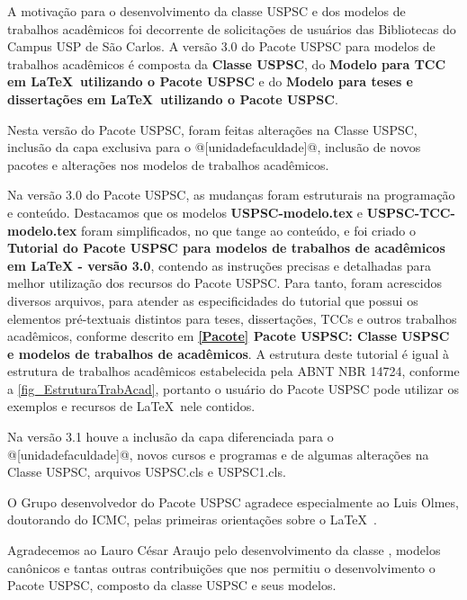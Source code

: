 \begin{agradecimentos}
	A motiva\c{c}\~ao para o desenvolvimento da classe USPSC e dos modelos de trabalhos acad\^emicos foi decorrente de solicita\c{c}\~oes de usu\'arios das Bibliotecas do Campus USP de S\~ao Carlos. A vers\~ao 3.0 do Pacote USPSC para modelos de trabalhos acad\^emicos \'e composta da \textbf{Classe USPSC}, do \textbf{Modelo para TCC em \LaTeX\ utilizando o Pacote USPSC} e do \textbf{Modelo para teses e disserta\c{c}\~oes em \LaTeX\ utilizando o Pacote USPSC}.
	
	Nesta vers\~ao do Pacote USPSC, foram feitas altera\c{c}\~oes na Classe USPSC, inclus\~ao da capa exclusiva para o @[unidadefaculdade]@, inclus\~ao de novos pacotes e altera\c{c}\~oes nos modelos de trabalhos acad\^emicos.
	
	Na vers\~ao 3.0 do Pacote USPSC, as mudan\c{c}as foram estruturais na programa\c{c}\~ao e conte\'udo. Destacamos que os modelos \textbf{USPSC-modelo.tex} e \textbf{USPSC-TCC-modelo.tex} foram simplificados, no que tange ao conte\'udo, e foi criado o \textbf{Tutorial do Pacote USPSC para modelos de trabalhos de acad\^emicos em LaTeX - vers\~ao 3.0}, contendo as instru\c{c}\~oes precisas e detalhadas para melhor utiliza\c{c}\~ao dos recursos do Pacote USPSC. Para tanto, foram acrescidos diversos arquivos, para atender as especificidades do tutorial que possui os elementos pr\'e-textuais distintos para teses, disserta\c{c}\~oes, TCCs e outros trabalhos acad\^emicos, conforme descrito em  \textbf{\ref{Pacote} Pacote USPSC: Classe USPSC e modelos de trabalhos de acad\^emicos}. A estrutura deste tutorial \'e igual \`a  estrutura de trabalhos acad\^emicos estabelecida pela ABNT NBR 14724, conforme a \autoref{fig_EstruturaTrabAcad}, portanto o usu\'ario do Pacote USPSC pode utilizar os exemplos e recursos de \LaTeX\ nele contidos.	
	 
	Na vers\~ao 3.1 houve a inclus\~ao da capa diferenciada para o @[unidadefaculdade]@, novos cursos e programas e de algumas altera\c{c}\~oes na Classe USPSC, arquivos USPSC.cls e  USPSC1.cls.
	
	O Grupo desenvolvedor do Pacote USPSC agradece especialmente ao Luis Olmes, doutorando do ICMC, pelas primeiras orienta\c{c}\~oes sobre o \LaTeX\ . 
	
	Agradecemos ao Lauro C\'esar Araujo pelo desenvolvimento da classe  \abnTeX, modelos can\^onicos e tantas outras contribui\c{c}\~oes que nos permitiu o desenvolvimento o Pacote USPSC, composto da classe USPSC e seus modelos.
	

\end{agradecimentos}
